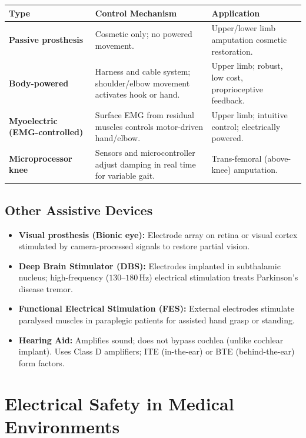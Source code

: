 \documentclass[12pt,a4paper]{article}
\begin{document}
\par\noindent
\begin{tabularx}{\linewidth}{|B{2.8cm}|Y|Y|}
\hline
\textbf{Type} & \textbf{\color{myteal}Control Mechanism} & \textbf{\color{mygreen}Application} \\
\hline
\textbf{Passive prosthesis} & Cosmetic only; no powered movement. & Upper/lower limb amputation cosmetic restoration. \\
\hline
\textbf{Body-powered} & Harness and cable system; shoulder/elbow movement activates hook or hand. & Upper limb; robust, low cost, proprioceptive feedback. \\
\hline
\textbf{Myoelectric (EMG-controlled)} & Surface EMG from residual muscles controls motor-driven hand/elbow. & Upper limb; intuitive control; electrically powered. \\
\hline
\textbf{Microprocessor knee} & Sensors and microcontroller adjust damping in real time for variable gait. & Trans-femoral (above-knee) amputation. \\
\hline
\end{tabularx}

\subsection{Other Assistive Devices}

\begin{itemize}[leftmargin=*, itemsep=3pt]
  \item \textbf{Visual prosthesis (Bionic eye):} Electrode array on retina or visual cortex stimulated by camera-processed signals to restore partial vision.
  \item \textbf{Deep Brain Stimulator (DBS):} Electrodes implanted in subthalamic nucleus; high-frequency ($130$--$180\,\text{Hz}$) electrical stimulation treats Parkinson's disease tremor.
  \item \textbf{Functional Electrical Stimulation (FES):} External electrodes stimulate paralysed muscles in paraplegic patients for assisted hand grasp or standing.
  \item \textbf{Hearing Aid:} Amplifies sound; does not bypass cochlea (unlike cochlear implant). Uses Class D amplifiers; ITE (in-the-ear) or BTE (behind-the-ear) form factors.
\end{itemize}

\section{Electrical Safety in Medical Environments}
\end{document}
